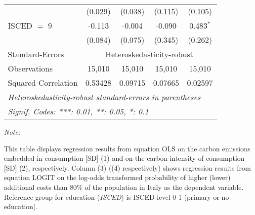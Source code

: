 \begin{table}[htbp!]
\begin{adjustbox}{width = 1\textwidth, max height = 0.95\textheight, center}
\begin{threeparttable}[b]
\begin{tabular}{lcccc}
                                 & (0.029)            & (0.038)            & (0.115)        & (0.105)\\   
            ISCED $=$ 9          & -0.113             & -0.004             & -0.090         & 0.483$^{*}$\\   
                                 & (0.084)            & (0.075)            & (0.345)        & (0.262)\\   
            \midrule 
            Standard-Errors & \multicolumn{4}{c}{Heteroskedasticity-robust} \\ 
            Observations         & 15,010             & 15,010             & 15,010         & 15,010\\  
            Squared Correlation  & 0.53428            & 0.09715            & 0.07665        & 0.02597\\  
            \midrule \midrule
            \multicolumn{5}{l}{\emph{Heteroskedasticity-robust standard-errors in parentheses}}\\
            \multicolumn{5}{l}{\emph{Signif. Codes: ***: 0.01, **: 0.05, *: 0.1}}\\
         \end{tabular}
         
         \begin{tablenotes}\item \medskip \textit{Note:}
            \item This table displays regression results from equation OLS on the carbon emissions embedded in consumption [SD] (1) and on the carbon intensity of consumption [SD] (2), respectively. 
                                      Column (3) ((4) respectively) shows regression results from equation LOGIT on the log-odds transformed probability of higher (lower) additional costs than 80\% of the population in Italy as the dependent variable. Reference group for education (\textit{ISCED}) is ISCED-level 0-1 (primary or no education).
         \end{tablenotes}
      \end{threeparttable}
   \end{adjustbox}
\end{table}


